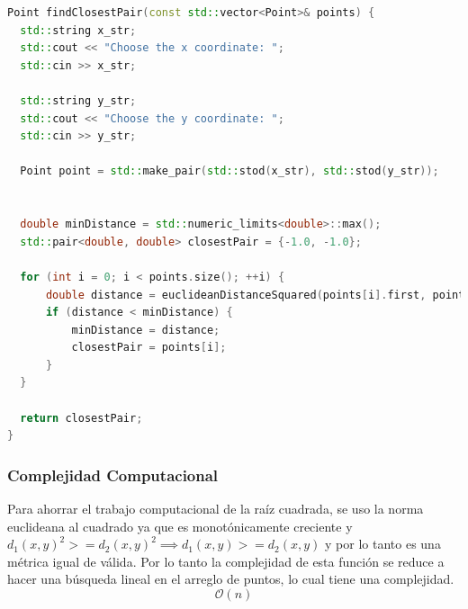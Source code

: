 \documentclass[12pt]{article}
\begin{document}
  \begin{lstlisting}[language=cpp, caption={Ubicación más cercana}, label={lst:nn}]
Point findClosestPair(const std::vector<Point>& points) {
  std::string x_str;
  std::cout << "Choose the x coordinate: ";
  std::cin >> x_str;

  std::string y_str;
  std::cout << "Choose the y coordinate: ";
  std::cin >> y_str;

  Point point = std::make_pair(std::stod(x_str), std::stod(y_str));


  double minDistance = std::numeric_limits<double>::max();
  std::pair<double, double> closestPair = {-1.0, -1.0};

  for (int i = 0; i < points.size(); ++i) {
      double distance = euclideanDistanceSquared(points[i].first, points[i].second, point.first, point.second);
      if (distance < minDistance) {
          minDistance = distance;
          closestPair = points[i];
      }
  }

  return closestPair;
}
  \end{lstlisting}

  \subsubsection{Complejidad Computacional}
  Para ahorrar el trabajo computacional de la raíz cuadrada, se uso la norma euclideana al cuadrado ya
  que es monotónicamente creciente y $d_{1}(x, y)^2 >=d_{2}(x, y)^2 \implies d_{1}(x, y) >=d_{2}(x, y)$ y por
  lo tanto es una métrica igual de válida. Por lo tanto la complejidad de esta función se reduce a hacer una búsqueda
  lineal en el arreglo de puntos, lo cual tiene una complejidad.
  \begin{equation}
    \mathcal{O}(n)
  \end{equation}
\end{document}
